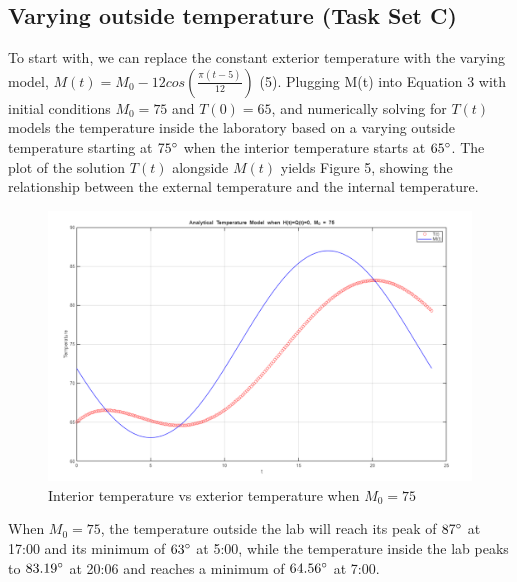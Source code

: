 \documentclass[12pt]{article}
\begin{document}
\subsection{Varying outside temperature (Task Set C)}
 To start with, we can replace the constant exterior temperature with the varying model, $M(t) = M_0 - 12cos(\frac{\pi(t-5)}{12})$ (5). Plugging M(t) into Equation 3 with initial conditions $M_0 = 75$ and $T(0)=65$, and numerically solving for $T(t)$ models the temperature inside the laboratory based on a varying outside temperature starting at $75\degree$ when the interior temperature starts at $65\degree$. The plot of the solution $T(t)$ alongside $M(t)$ yields Figure 5, showing the relationship between the external temperature and the internal temperature. 
\begin{figure}[H]
    \centering
    \includegraphics[width=0.75\linewidth]{images/Task_C1.png}
    \caption{Interior temperature vs exterior temperature when $M_0=75$}
    \label{fig:placeholder}
\end{figure}
When $M_0 = 75$, the temperature outside the lab will reach its peak of $87\degree$ at 17:00 and its minimum of $63\degree$ at 5:00, while the temperature inside the lab peaks to $83.19\degree$ at 20:06 and reaches a minimum of $64.56\degree$ at 7:00.
\end{document}
